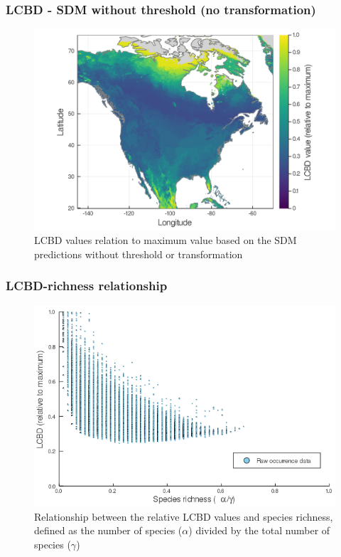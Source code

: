 \documentclass[10pt]{beamer}
\begin{document}
\begin{frame}
  \frametitle{LCBD - SDM without threshold (no transformation)}
  \begin{figure}
    \centering
    \hspace*{-0cm}\includegraphics[scale=0.17]{fig/05_sdm_lcbd.png}
    \caption{LCBD values relation to maximum value based on the SDM predictions without threshold or transformation}
  \end{figure}
\end{frame}

\begin{frame}
  \frametitle{LCBD-richness relationship}
  \begin{figure}
    \centering
    \includegraphics[scale=0.4]{fig/06_raw_relation.png}
    \caption{Relationship between the relative LCBD values and species richness, defined as the number of species ($\alpha$) divided by the total number of species ($\gamma$)}
  \end{figure}
\end{frame}
\end{document}
